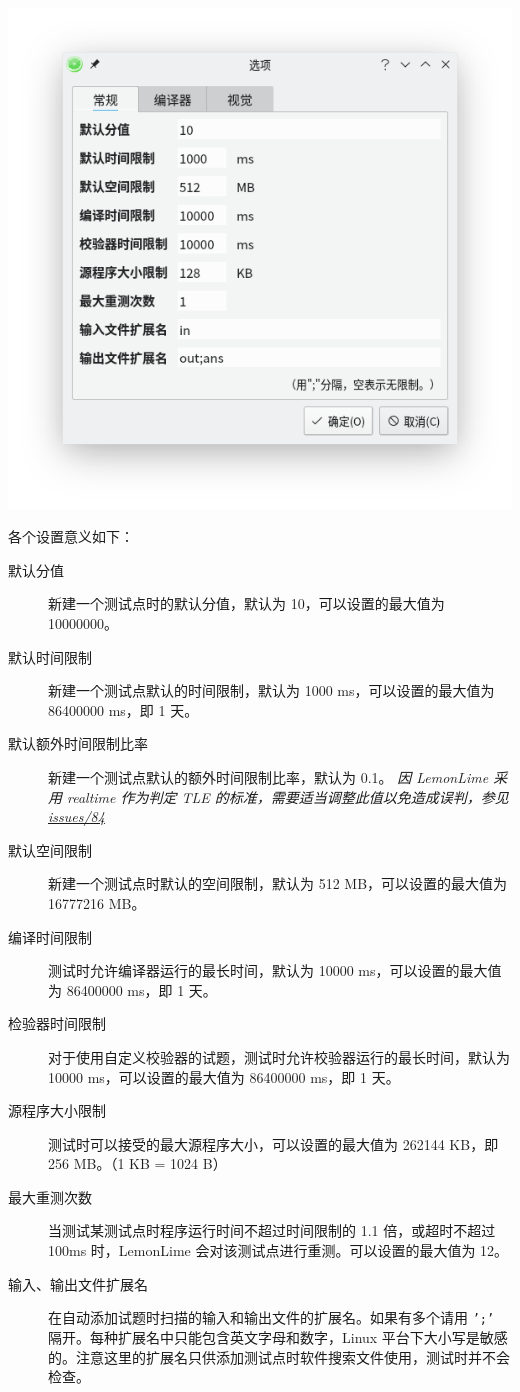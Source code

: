 \documentclass[UTF-8]{ctexart}
\begin{document}
				\begin{center}
				\includegraphics[scale=0.7]{pics/generalsettings.png}
				\end{center}

				各个设置意义如下：

				\begin{description}
					\item[默认分值] 新建一个测试点时的默认分值，默认为 10，可以设置的最大值为 10000000。
					\item[默认时间限制] 新建一个测试点默认的时间限制，默认为 1000 ms，可以设置的最大值为 86400000 ms，即 1 天。
					\item[默认额外时间限制比率] 新建一个测试点默认的额外时间限制比率，默认为 0.1。 \emph{因 LemonLime 采用 realtime 作为判定 TLE 的标准，需要适当调整此值以免造成误判，参见\href{https://github.com/Project-LemonLime/Project_LemonLime/issues/84}{issues/84}}
					\item[默认空间限制] 新建一个测试点时默认的空间限制，默认为 512 MB，可以设置的最大值为 16777216 MB。
					\item[编译时间限制] 测试时允许编译器运行的最长时间，默认为 10000 ms，可以设置的最大值为 86400000 ms，即 1 天。
					\item[检验器时间限制] 对于使用自定义校验器的试题，测试时允许校验器运行的最长时间，默认为 10000 ms，可以设置的最大值为 86400000 ms，即 1 天。
					\item[源程序大小限制] 测试时可以接受的最大源程序大小，可以设置的最大值为 262144 KB，即 256 MB。（1 KB = 1024 B）
					\item[最大重测次数] 当测试某测试点时程序运行时间不超过时间限制的 1.1 倍，或超时不超过 100ms 时，LemonLime 会对该测试点进行重测。可以设置的最大值为 12。
					\item[输入、输出文件扩展名]  在自动添加试题时扫描的输入和输出文件的扩展名。如果有多个请用 \texttt{';'} 隔开。每种扩展名中只能包含英文字母和数字，Linux 平台下大小写是敏感的。注意这里的扩展名只供添加测试点时软件搜索文件使用，测试时并不会检查。
				\end{description}
\end{document}

